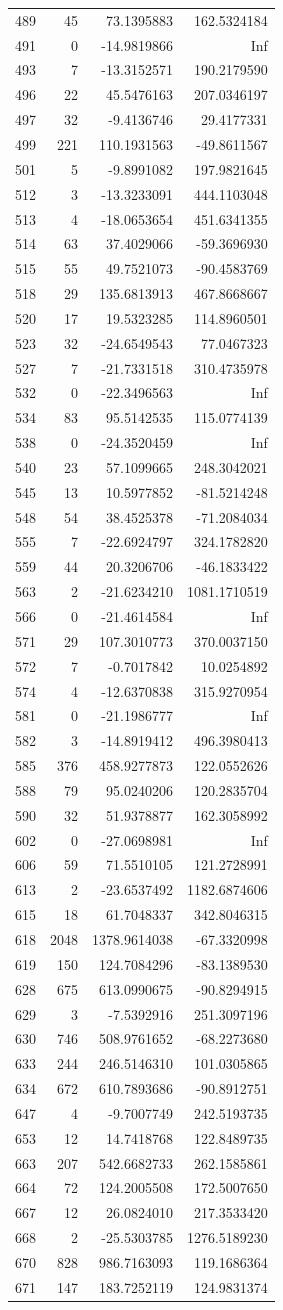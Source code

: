 \documentclass[
]{article}
\begin{document}
\begin{longtable}[]{@{}lrrr@{}}
489 & 45 & 73.1395883 & 162.5324184\tabularnewline
491 & 0 & -14.9819866 & Inf\tabularnewline
493 & 7 & -13.3152571 & 190.2179590\tabularnewline
496 & 22 & 45.5476163 & 207.0346197\tabularnewline
497 & 32 & -9.4136746 & 29.4177331\tabularnewline
499 & 221 & 110.1931563 & -49.8611567\tabularnewline
501 & 5 & -9.8991082 & 197.9821645\tabularnewline
512 & 3 & -13.3233091 & 444.1103048\tabularnewline
513 & 4 & -18.0653654 & 451.6341355\tabularnewline
514 & 63 & 37.4029066 & -59.3696930\tabularnewline
515 & 55 & 49.7521073 & -90.4583769\tabularnewline
518 & 29 & 135.6813913 & 467.8668667\tabularnewline
520 & 17 & 19.5323285 & 114.8960501\tabularnewline
523 & 32 & -24.6549543 & 77.0467323\tabularnewline
527 & 7 & -21.7331518 & 310.4735978\tabularnewline
532 & 0 & -22.3496563 & Inf\tabularnewline
534 & 83 & 95.5142535 & 115.0774139\tabularnewline
538 & 0 & -24.3520459 & Inf\tabularnewline
540 & 23 & 57.1099665 & 248.3042021\tabularnewline
545 & 13 & 10.5977852 & -81.5214248\tabularnewline
548 & 54 & 38.4525378 & -71.2084034\tabularnewline
555 & 7 & -22.6924797 & 324.1782820\tabularnewline
559 & 44 & 20.3206706 & -46.1833422\tabularnewline
563 & 2 & -21.6234210 & 1081.1710519\tabularnewline
566 & 0 & -21.4614584 & Inf\tabularnewline
571 & 29 & 107.3010773 & 370.0037150\tabularnewline
572 & 7 & -0.7017842 & 10.0254892\tabularnewline
574 & 4 & -12.6370838 & 315.9270954\tabularnewline
581 & 0 & -21.1986777 & Inf\tabularnewline
582 & 3 & -14.8919412 & 496.3980413\tabularnewline
585 & 376 & 458.9277873 & 122.0552626\tabularnewline
588 & 79 & 95.0240206 & 120.2835704\tabularnewline
590 & 32 & 51.9378877 & 162.3058992\tabularnewline
602 & 0 & -27.0698981 & Inf\tabularnewline
606 & 59 & 71.5510105 & 121.2728991\tabularnewline
613 & 2 & -23.6537492 & 1182.6874606\tabularnewline
615 & 18 & 61.7048337 & 342.8046315\tabularnewline
618 & 2048 & 1378.9614038 & -67.3320998\tabularnewline
619 & 150 & 124.7084296 & -83.1389530\tabularnewline
628 & 675 & 613.0990675 & -90.8294915\tabularnewline
629 & 3 & -7.5392916 & 251.3097196\tabularnewline
630 & 746 & 508.9761652 & -68.2273680\tabularnewline
633 & 244 & 246.5146310 & 101.0305865\tabularnewline
634 & 672 & 610.7893686 & -90.8912751\tabularnewline
647 & 4 & -9.7007749 & 242.5193735\tabularnewline
653 & 12 & 14.7418768 & 122.8489735\tabularnewline
663 & 207 & 542.6682733 & 262.1585861\tabularnewline
664 & 72 & 124.2005508 & 172.5007650\tabularnewline
667 & 12 & 26.0824010 & 217.3533420\tabularnewline
668 & 2 & -25.5303785 & 1276.5189230\tabularnewline
670 & 828 & 986.7163093 & 119.1686364\tabularnewline
671 & 147 & 183.7252119 & 124.9831374\tabularnewline

\end{longtable}
\end{document}
